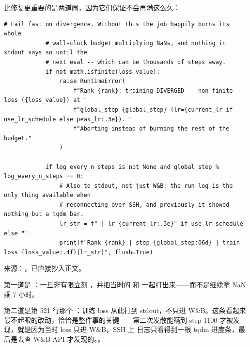 比修复更重要的是两道闸，因为它们保证不会再瞒这么久：

\begin{lstlisting}[style=hlnum, firstnumber=507]
            # Fail fast on divergence. Without this the job happily burns its whole
            # wall-clock budget multiplying NaNs, and nothing in stdout says so until the
            # next eval -- which can be thousands of steps away.
            if not math.isfinite(loss_value):
                raise RuntimeError(
                    f"Rank {rank}: training DIVERGED -- non-finite loss ({loss_value}) at "
                    f"global_step {global_step} (lr={current_lr if use_lr_schedule else peak_lr:.3e}). "
                    f"Aborting instead of burning the rest of the budget."
                )

            if log_every_n_steps is not None and global_step % log_every_n_steps == 0:
                # Also to stdout, not just W&B: the run log is the only thing available when
                # reconnecting over SSH, and previously it showed nothing but a tqdm bar.
                lr_str = f" | lr {current_lr:.3e}" if use_lr_schedule else ""
                print(f"Rank {rank} | step {global_step:06d} | train loss {loss_value:.4f}{lr_str}", flush=True)
\end{lstlisting}
\noindent 来源：，已直接抄入正文。

第一道是 ：一旦非有限立刻 ，并把当时的  和  一起打出来——而不是继续拿 NaN 乘 7 小时。

第二道是第 521 行那个 ：训练 loss 从此打到 stdout，不只进 W\&B。这条看起来最不起眼的改动，恰恰是整件事的关键——第二次发散能瞒到 step 1100 才被发现，就是因为当时 loss 只进 W\&B，SSH 上  日志只看得到一根 tqdm 进度条，最后是去查 W\&B API 才发现的。。

